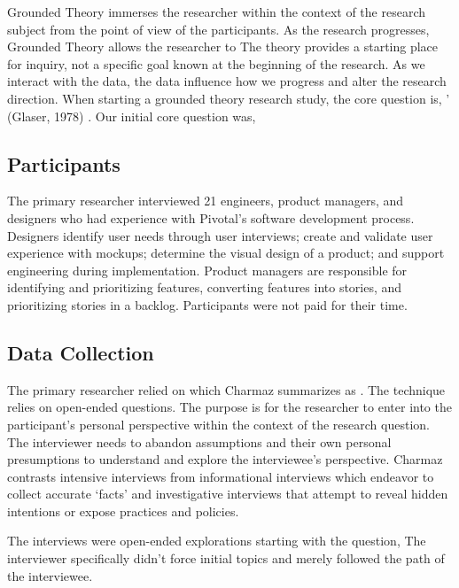 Grounded Theory immerses the researcher within the context of the research subject from the point of view of the participants. As the research progresses, Grounded Theory allows the researcher to  The theory provides a starting place for inquiry, not a specific goal known at the beginning of the research. As we interact with the data, the data influence how we progress and alter the research direction. When starting a grounded theory research study, the core question is, ' (Glaser, 1978) \cite{GlaserTheoreticalSensitivity}. Our initial core question was, 

\subsection{Participants}
The primary researcher interviewed 21 engineers, product managers, and designers who had experience with Pivotal's software development process. Designers identify user needs through user interviews; create and validate user experience with mockups; determine the visual design of a product; and support engineering during implementation. Product managers are responsible for identifying and prioritizing features, converting features into stories, and prioritizing stories in a backlog.  Participants were not paid for their time. 
\subsection{Data Collection}
The primary researcher relied on  which Charmaz summarizes as  \cite{Charmaz}. The technique relies on open-ended questions. The purpose is for the researcher to enter into the participant's personal perspective within the context of the research question. The interviewer needs to abandon assumptions and their own personal presumptions to understand and explore the interviewee's perspective. Charmaz \cite{Charmaz} contrasts intensive interviews from informational interviews which endeavor to collect accurate `facts' and investigative interviews that attempt to reveal hidden intentions or expose practices and policies. 
 
The interviews were open-ended explorations starting with the question,  The interviewer specifically didn't force initial topics and merely followed the path of the interviewee. 

